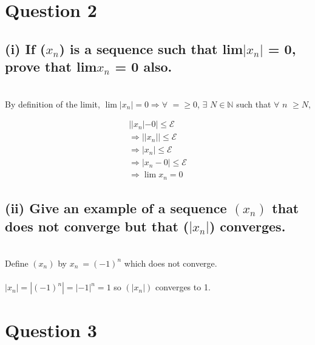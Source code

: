 \documentclass{article}
\begin{document}
\section*{Question 2}
\subsection*{(i) If (\(x_n\)) is a sequence such that lim\(|x_n|\) = 0, prove that lim\(x_n\) = 0 also.}

\solution
\\
By definition of the limit, \(\lim|x_n| = 0 \Rightarrow \forall\) \(= \geq 0\), \(\exists\) \(N \in \mathds{N}\) such that \(\forall\) \(n\) \(\geq N\),

\begin{align}
  \label{}
  ||x_n| - 0| \leq \mathcal{E} \nonumber \\
  \Rightarrow ||x_n|| \leq \mathcal{E} \nonumber \\
  \Rightarrow |x_n| \leq \mathcal{E} \nonumber \\
  \Rightarrow |x_n - 0| \leq \mathcal{E} \nonumber \\
  \Rightarrow \lim x_n = 0 \nonumber
\end{align}

\subsection*{(ii) Give an example of a sequence \((x_n)\) that does not converge but that (\(|x_n|\)) converges.}
\solution
\\
Define \((x_n)\) by \(x_n\ = (-1)^n\) which does not converge.
\\
\\
\(|x_n| = |(-1)^n| = |-1|^n = 1\) so \((|x_n|)\) converges to 1.

\section*{Question 3}
\end{document}
